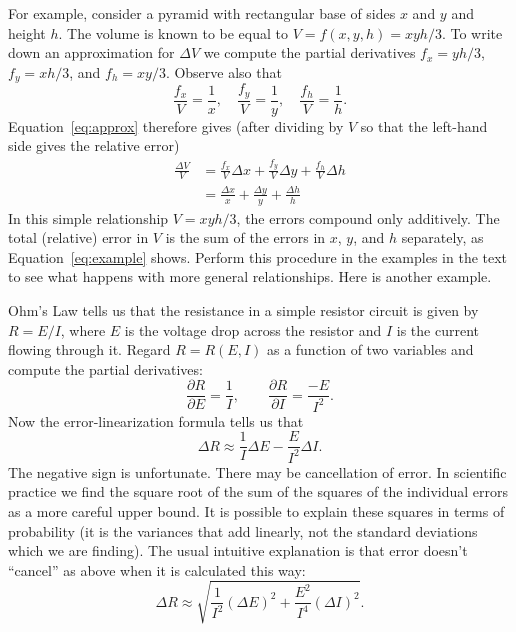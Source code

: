 \documentclass[11pt]{amsart}
\begin{document}
For example, consider a pyramid with rectangular base of sides $x$ and $y$ and height $h$. The volume is known to be equal to $V = f(x,y,h) = xyh/3$. To write down an approximation for $\Delta V$ we compute the partial derivatives $f_x = yh/3$, $f_y = xh/3$, and $f_h = xy/3$. Observe also that
\[
    \frac{f_x}{V} = \frac{1}{x}, \quad \frac{f_y}{V} = \frac{1}{y}, \quad \frac{f_h}{V} = \frac{1}{h}.
\]
Equation~\ref{eq:approx} therefore gives (after dividing by $V$ so that the left-hand side gives the relative error)
\begin{align}\label{eq:example}
\frac{\Delta V}{V} &= \frac{f_x}{V} \Delta x + \frac{f_y}{V} \Delta y + \frac{f_h}{V} \Delta h \\
                   &= \frac{\Delta x}{x} + \frac{\Delta y}{y} + \frac{\Delta h}{h}
\end{align} 
In this simple relationship $V = xyh/3$, the errors compound only additively. The total (relative) error in $V$ is the sum of the errors in $x$, $y$, and $h$ separately, as Equation~\ref{eq:example} shows. Perform this procedure in the examples in the text to see what happens with more general relationships. Here is another example.

Ohm's Law tells us that the resistance in a simple resistor circuit is given by $R = E/I$, where $E$ is the voltage drop across the resistor and $I$ is the current flowing through it. Regard $R = R(E,I)$ as a function of two variables and compute the partial derivatives:
\[
    \frac{\partial R}{\partial E} = \frac{1}{I}, \qquad \frac{\partial R}{\partial I} = \frac{-E}{I^2}.
\]
Now the error-linearization formula tells us that 
\[
\Delta R \approx \frac{1}{I} \Delta E  - \frac{E}{I^2} \Delta I.
\]
The negative sign is unfortunate. There may be cancellation of error. In scientific practice we find the square root of the sum of the squares of the individual errors as a more careful upper bound. It is possible to explain these squares in terms of probability (it is the variances that add linearly, not the standard deviations which we are finding). The usual intuitive explanation is that error doesn't ``cancel'' as above when it is calculated this way:
\[
\Delta R \approx \sqrt{\frac{1}{I^2} (\Delta E)^2 + \frac{E^2}{I^4} (\Delta I)^2}.
\]
\end{document}
